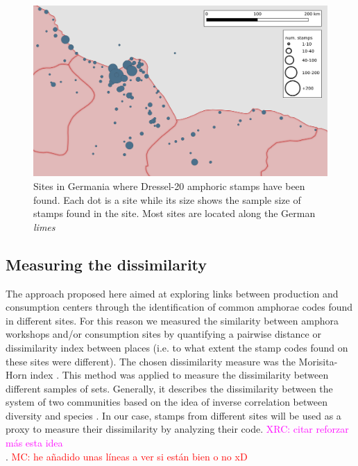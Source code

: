 \documentclass[review]{elsarticle}
\newcommand{\memo}[2]{\textcolor{#1}{#2}}
\newcommand{\maria}[1]{\memo{red}{MC: #1\\}}
\newcommand{\xavi}[1]{\memo{magenta}{XRC: #1\\}}
\begin{document}
\begin{figure}[htp]
	\centering
\includegraphics[width=\linewidth]{figs/germania}
\caption{Sites in Germania where Dressel-20 amphoric stamps have been found. Each dot is a site while its size shows the sample size of stamps found in the site. Most sites are located along the German \textit{limes}}
\label{germania}
\end{figure}


\subsection{Measuring the dissimilarity}



The approach proposed here aimed at exploring links between production and consumption centers through the identification of common amphorae codes found in different sites. For this reason we measured the similarity between amphora workshops and/or consumption sites by quantifying a pairwise distance or dissimilarity index between places (i.e. to what extent the stamp codes found on these sites were different). The chosen dissimilarity measure was the Morisita-Horn index \citep{morisita_measuring_1959, horn_measurement_1966}. This method was applied to measure the dissimilarity between different samples of sets. Generally, it describes the dissimilarity between the system of two communities based on the idea of inverse correlation between diversity and species \citep{magurran_why_1988}. In our case, stamps from different sites will be used as a proxy to measure their dissimilarity by analyzing their code. 
\xavi{citar reforzar más esta idea}.
\maria{he añadido unas líneas a ver si están bien o no xD}
\end{document}

